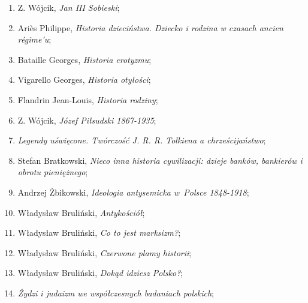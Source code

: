 \documentclass[a4paper,11pt]{article}
\begin{document}
\begin{enumerate}
\item Z. Wójcik, \textit{Jan III Sobieski};



\item Ariès Philippe, \textit{Historia dzieciństwa. Dziecko i rodzina w
    czasach ancien régime’u};



\item Bataille Georges, \textit{Historia erotyzmu};



\item Vigarello Georges, \textit{Historia otyłości};



\item Flandrin Jean-Louis, \textit{Historia rodziny};



\item Z. Wójcik, \textit{Józef Piłsudski 1867-1935};



\item \textit{Legendy uświęcone. Twórczość J. R. R. Tolkiena a
    chrześcijaństwo};



\item Stefan Bratkowski, \textit{Nieco inna historia cywilizacji: dzieje
    banków, bankierów i obrotu pieniężnego};



\item Andrzej Żbikowski, \textit{Ideologia antysemicka w~Polsce
    1848-1918};



\item Władysław Bruliński, \textit{Antykościół};



\item Władysław Bruliński, \textit{Co to jest marksizm?};



\item Władysław Bruliński, \textit{Czerwone plamy historii};



\item Władysław Bruliński, \textit{Dokąd idziesz Polsko?};



\item \textit{Żydzi i judaizm we współczesnych badaniach polskich};




\end{enumerate}
\end{document}
